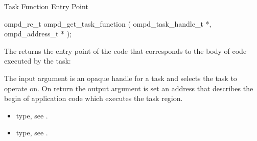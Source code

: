 %
%
%


\label{ompd:ompd_get_task_function}
\summary
Task Function Entry Point
\format
\cspecificstart
\begin{boxedcode}
ompd\_rc\_t ompd\_get\_task\_function (
  ompd\_task\_handle\_t *,
  ompd\_address\_t * 
);
\end{boxedcode}
\cspecificend

\descr
The  returns the entry point of the code
that corresponds to the body of code executed by the task:

\argdesc
The input argument  is an opaque handle for a task and selects the task to operate on.
On return the output argument  is set an address that describes the begin of application
code which executes the task region.

\crossreferences
\begin{itemize}
	\item {} type, see .
	\item {} type, see .
\end{itemize}


